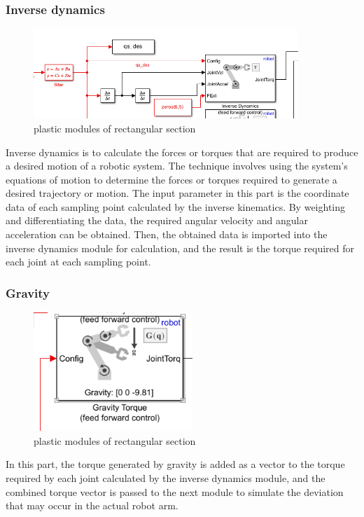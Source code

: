 \subsubsection*{Inverse dynamics}

\begin{figure}[htbp]
    \centering
    \includegraphics[width=10cm]{./fig/ID.png}
    \caption{plastic modules of rectangular section  }
    \label{f1}
\end{figure}

Inverse dynamics is to calculate the forces or torques that are required to produce a desired motion of a robotic system. The technique involves using the system's equations of motion to determine the forces or torques required to generate a desired trajectory or motion. The input parameter in this part is the coordinate data of each sampling point calculated by the inverse kinematics. By weighting and differentiating the data, the required angular velocity and angular acceleration can be obtained. Then, the obtained data is imported into the inverse dynamics module for calculation, and the result is the torque required for each joint at each sampling point.


\subsubsection*{Gravity}

\begin{figure}[htbp]
    \centering
    \includegraphics[width=6cm]{./fig/G.png}
    \caption{plastic modules of rectangular section  }
    \label{f1}
\end{figure}

In this part, the torque generated by gravity is added as a vector to the torque required by each joint calculated by the inverse dynamics module, and the combined torque vector is passed to the next module to simulate the deviation that may occur in the actual robot arm.



